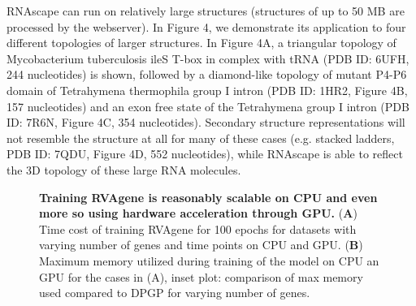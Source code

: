 RNAscape can run on relatively large structures (structures of up to 50 MB are processed by the webserver). In Figure 4, we demonstrate its application to four different topologies of larger structures. In Figure 4A, a triangular topology of Mycobacterium tuberculosis ileS T-box in complex with tRNA (PDB ID: 6UFH, 244 nucleotides) is shown, followed by a diamond-like topology of mutant P4-P6 domain of Tetrahymena thermophila group I intron (PDB ID: 1HR2, Figure 4B, 157 nucleotides) and an exon free state of the Tetrahymena group I intron (PDB ID: 7R6N, Figure 4C, 354 nucleotides). Secondary structure representations will not resemble the structure at all for many of these cases (e.g. stacked ladders, PDB ID: 7QDU, Figure 4D, 552 nucleotides), while RNAscape is able to reflect the 3D topology of these large RNA molecules.
\begin{center}
    \begin{figure}
        \caption[Computational cost of training RVAgene]{\textbf{Training RVAgene is reasonably scalable on CPU and even more so using hardware acceleration through GPU.} ({\bf A}) Time cost of training RVAgene for 100 epochs for datasets with varying number of genes and time points on CPU and GPU. ({\bf B}) Maximum memory utilized during training of the model on CPU an GPU for the cases in (A), inset plot: comparison of max memory used compared to DPGP for varying number of genes.}
  \label{fig:rnascape3}
\end{figure}
\end{center}
